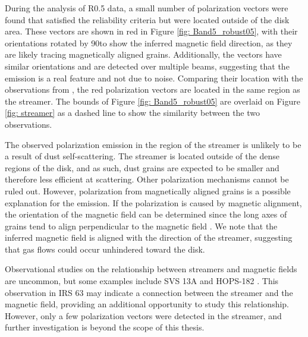  During the analysis of \bfive R0.5 data, a small number of polarization vectors were found that satisfied the reliability criteria but were located outside of the disk area. These vectors are shown in red in Figure \ref{fig: Band5_robust05}, with their orientations rotated by 90\degg to show the inferred magnetic field direction, as they are likely tracing magnetically aligned grains. Additionally, the vectors have similar orientations and are detected over multiple beams, suggesting that the emission is a real feature and not due to noise. Comparing their location with the observations from \cite{Podio}, the red polarization vectors are located in the same region as the streamer. The bounds of Figure \ref{fig: Band5_robust05} are overlaid on Figure \ref{fig: streamer} as a dashed line to show the similarity between the two observations. 



The observed polarization emission in the region of the streamer is unlikely to be a result of dust self-scattering. The streamer is located outside of the dense regions of the disk, and as such, dust grains are expected to be smaller and therefore less efficient at scattering. Other polarization mechanisms cannot be ruled out. However, polarization from magnetically aligned grains is a possible explanation for the emission. If the polarization is caused by magnetic alignment, the orientation of the magnetic field can be determined since the long axes of grains tend to align perpendicular to the magnetic field \citep{Lazarian}. We note that the inferred magnetic field is aligned with the direction of the streamer, suggesting that gas flows could occur unhindered toward the disk.


Observational studies on the relationship between streamers and magnetic fields are uncommon, but some examples include SVS 13A \citep{Cort} and HOPS-182 \citep{Huang_2026}. This observation in IRS 63 may indicate a connection between the streamer and the magnetic field, providing an additional opportunity to study this relationship. However, only a few polarization vectors were detected in the streamer, and further investigation is beyond the scope of this thesis.



 







